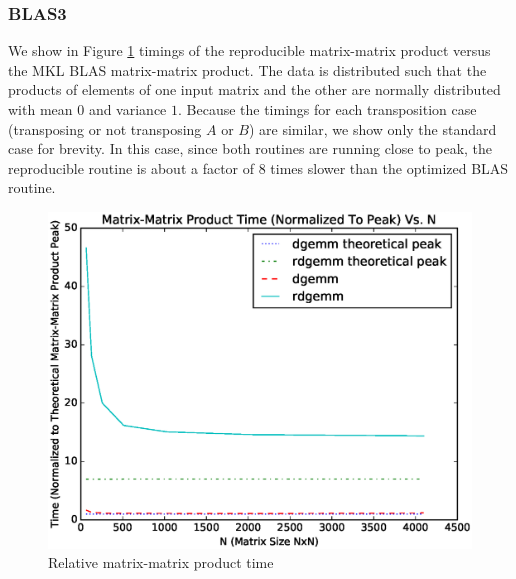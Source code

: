   \subsubsection{BLAS3}
    We show in Figure \ref{fig:gemm_timings} timings of the reproducible matrix-matrix product versus the MKL BLAS matrix-matrix product. The data is distributed such that the products of elements of one input matrix and the other are normally distributed with mean $0$ and variance $1$. Because the timings for each transposition case (transposing or not transposing $A$ or $B$) are similar, we show only the standard case for brevity. In this case, since both routines are running close to peak, the reproducible routine is about a factor of 8 times slower than the optimized BLAS routine.
  \begin{figure}[H]
  \begin{center}
  \includegraphics[width=\textwidth]{plots/gemm_comparison}
  \caption{Relative matrix-matrix product time}
  \label{fig:gemm_timings}
  \end{center}
  \end{figure}

